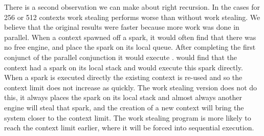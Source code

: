 There is a second observation we can make about right recursion.
In the cases for 256 or 512 contexts work stealing performs worse than
without work stealing.
We believe that the original results were faster because more work was done
in parallel.
When a context spawned off a spark,
it would often find that there was no free engine,
and place the spark on its local queue.
After completing the first conjunct of the parallel conjunction it would
execute \joinandcontinue.
\joinandcontinue would find that the context had a spark on its local
stack and would execute this spark directly.
When a spark is executed directly the existing context is re-used and so the
context limit does not increase as quickly.
The work stealing version does not do this,
it always places the spark on its local stack and almost always
another engine will steal that spark,
and the creation of a new context will bring the system closer to the
context limit.
The work stealing program is more likely to reach the context limit earlier,
where it will be forced into sequential execution.


